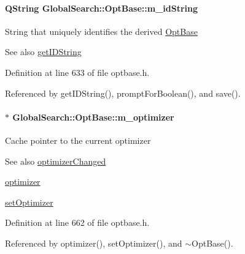 \paragraph[{m\+\_\+id\+String}]{\setlength{\rightskip}{0pt plus 5cm}Q\+String Global\+Search\+::\+Opt\+Base\+::m\+\_\+id\+String\hspace{0.3cm}{\ttfamily [protected]}}\label{classGlobalSearch_1_1OptBase_af9223062bbb616246d5bf60ad29e1c7d}
String that uniquely identifies the derived \hyperlink{classGlobalSearch_1_1OptBase}{Opt\+Base} \begin{DoxySeeAlso}{See also}
\hyperlink{classGlobalSearch_1_1OptBase_ae4223191dd58c47e186bbdf07f99ef1c}{get\+I\+D\+String} 
\end{DoxySeeAlso}


Definition at line 633 of file optbase.\+h.



Referenced by get\+I\+D\+String(), prompt\+For\+Boolean(), and save().

\hypertarget{classGlobalSearch_1_1OptBase_a9bc76450b0d52ab9fc9a4caaf97143b7}{}
\paragraph[{m\+\_\+optimizer}]{$\ast$ Global\+Search\+::\+Opt\+Base\+::m\+\_\+optimizer\hspace{0.3cm}{\ttfamily [protected]}}\label{classGlobalSearch_1_1OptBase_a9bc76450b0d52ab9fc9a4caaf97143b7}
Cache pointer to the current optimizer \begin{DoxySeeAlso}{See also}
\hyperlink{classGlobalSearch_1_1OptBase_a8f07729ab8372e2a41de0d38d7947c6a}{optimizer\+Changed} 

\hyperlink{classGlobalSearch_1_1OptBase_a4dce62d15f24d665c807047aa5c618fc}{optimizer} 

\hyperlink{classGlobalSearch_1_1OptBase_addd46a192c8a68553a12b30d18246f1e}{set\+Optimizer} 
\end{DoxySeeAlso}


Definition at line 662 of file optbase.\+h.



Referenced by optimizer(), set\+Optimizer(), and $\sim$\+Opt\+Base().

\hypertarget{classGlobalSearch_1_1OptBase_a187a29ceafe0c4a45ecb7a925267f93a}{}
